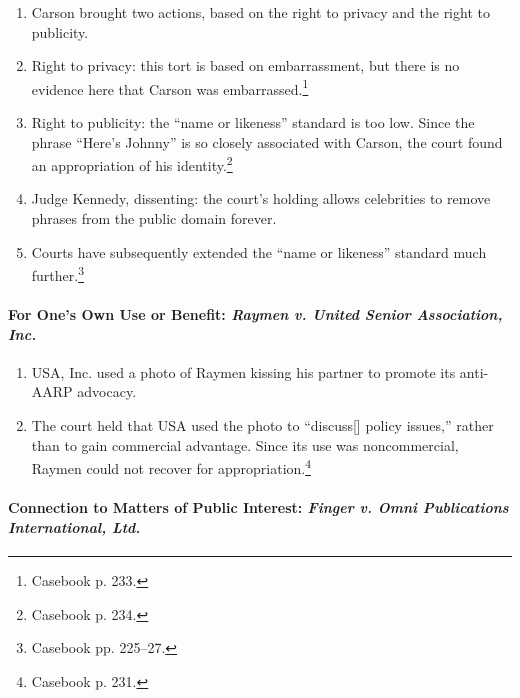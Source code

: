\begin{enumerate}
    \item Carson brought two actions, based on the right to privacy and the 
    right to publicity.
    \item Right to privacy: this tort is based on embarrassment, but there is no 
    evidence here that Carson was embarrassed.\footnote{Casebook p. 233.}
    \item Right to publicity: the ``name or likeness'' standard is too low. 
    Since the phrase ``Here's Johnny'' is so closely associated with Carson, the 
    court found an appropriation of his identity.\footnote{Casebook p. 234.}
    \item Judge Kennedy, dissenting: the court's holding allows celebrities to 
    remove phrases from the public domain forever.
    \item Courts have subsequently extended the ``name or likeness'' standard 
    much further.\footnote{Casebook pp. 225--27.}
\end{enumerate}

\paragraph{For One's Own Use or Benefit: \emph{Raymen v. United Senior 
Association, Inc.}}

\begin{enumerate}
    \item USA, Inc. used a photo of Raymen kissing his partner to promote its 
    anti-AARP advocacy.
    \item The court held that USA used the photo to ``discuss[] policy issues,'' 
    rather than to gain commercial advantage. Since its use was noncommercial, 
    Raymen could not recover for appropriation.\footnote{Casebook p. 231.}
\end{enumerate}

\paragraph{Connection to Matters of Public Interest: \emph{Finger v. Omni 
Publications International, Ltd.}}

